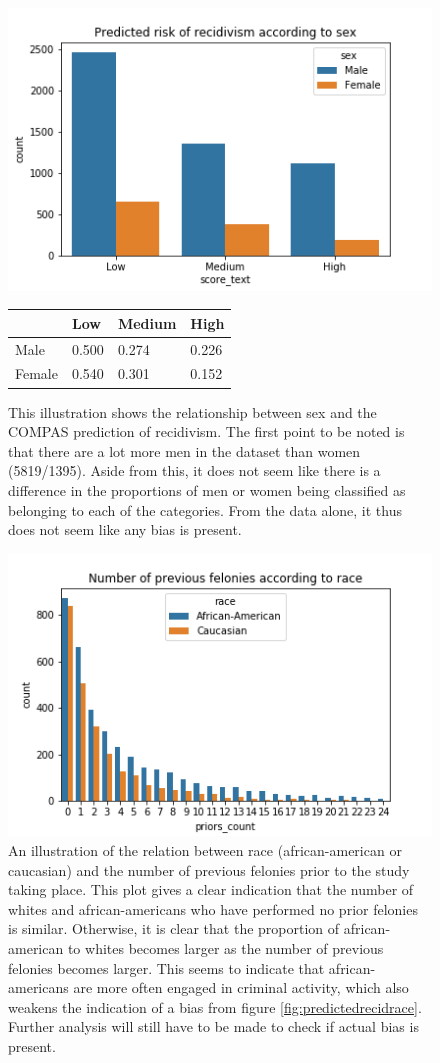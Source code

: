 \documentclass[11pt, fleqn, titlepage]{article}
\begin{document}
	\begin{figure}[H]
		\centering
		\includegraphics[width=0.5\linewidth]{imgs/predicted_recid_sex}
		\begin{table}[H]
			\centering
			\begin{tabular}{|l|l|l|l|}
				\hline
				& Low   & Medium & High  \\ \hline
				Male      & 0.500 & 0.274  & 0.226 \\ \hline
				Female    & 0.540 & 0.301  & 0.152 \\ \hline
			\end{tabular}
		\end{table}
		\caption{This illustration shows the relationship between sex and the COMPAS prediction of recidivism. The first point to be noted is that there are a lot more men in the dataset than women (5819/1395). Aside from this, it does not seem like there is a difference in the proportions of men or women being classified as belonging to each of the categories. From the data alone, it thus does not seem like any bias is present.}
		\label{fig:predictedrecidsex}
	\end{figure}
	
	\begin{figure}[H]
		\centering
		\includegraphics[width=0.5\linewidth]{imgs/proirs}
		\caption{An illustration of the relation between race (african-american or caucasian) and the number of previous felonies prior to the study taking place. This plot gives a clear indication that the number of whites and african-americans who have performed no prior felonies is similar. Otherwise, it is clear that the proportion of african-american to whites becomes larger as the number of previous felonies becomes larger. This seems to indicate that african-americans are more often engaged in criminal activity, which also weakens the indication of a bias from figure \ref{fig:predictedrecidrace}. Further analysis will still have to be made to check if actual bias is present.}
		\label{fig:proirs}
	\end{figure}
	
\end{document}
